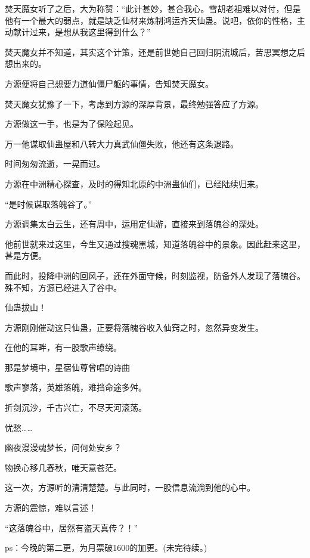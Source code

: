 \begin{this_body}
焚天魔女听了之后，大为称赞：“此计甚妙，甚合我心。雪胡老祖难以对付，但是他有一个最大的弱点，就是缺乏仙材来炼制鸿运齐天仙蛊。说吧，依你的性格，主动献计过来，是想从我这里得到什么？”

焚天魔女并不知道，其实这个计策，还是前世她自己回归阴流城后，苦思冥想之后想出来的。

方源便将自己想要力道仙僵尸躯的事情，告知焚天魔女。

焚天魔女犹豫了一下，考虑到方源的深厚背景，最终勉强答应了方源。

方源做这一手，也是为了保险起见。

万一他谋取仙蛊屋和八转大力真武仙僵失败，他还有这条退路。

时间匆匆流逝，一晃而过。

方源在中洲精心探查，及时的得知北原的中洲蛊仙们，已经陆续归来。

“是时候谋取落魄谷了。”

方源调集太白云生，还有周中，运用定仙游，直接来到落魄谷的深处。

他前世就来过这里，今生又通过搜魂黑城，知道落魄谷中的景象。因此赶来这里，甚是方便。

而此时，投降中洲的回风子，还在外面守候，时刻监视，防备外人发现了落魄谷。殊不知，方源已经进入了谷中。

仙蛊拔山！

方源刚刚催动这只仙蛊，正要将落魄谷收入仙窍之时，忽然异变发生。

在他的耳畔，有一股歌声缭绕。

那是梦境中，星宿仙尊曾唱的诗曲

歌声寥落，英雄落魄，难挡命途多舛。

折剑沉沙，千古兴亡，不尽天河滚荡。

忧愁……

幽夜漫漫魂梦长，问何处安乡？

物换心移几春秋，唯天意苍茫。

这一次，方源听的清清楚楚。与此同时，一股信息流淌到他的心中。

方源的震惊，难以言述！

“这落魄谷中，居然有盗天真传？！”

ps：今晚的第二更，为月票破1600的加更。(未完待续。)

\end{this_body}

